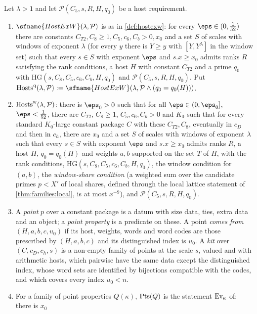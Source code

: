 \begin{definition}\label{pf:stageU:kitsdef}
Let $\lambda>1$ and let $\mathcal P(C_5,s,R,H,q_0)$ be a host requirement.
\begin{enumerate}[label=(\alph*)]
\item $\sfname{HostExW}(\lambda,\mathcal P)$ is as in \cref{def:hostexw}: for every $\eps\in(0,\frac1{52})$ there are constants
$C_{T2},C_8\ge1,C_5,c_6,C_b>0,x_0$ and a set $S$ of scales with windows of exponent $\lambda$ (for every $y$ there is
$Y\ge y$ with $[Y,Y^\lambda]$ in the window set) such that every $s\in S$ with exponent $\eps$ and $s.x\ge x_0$ admits
ranks $R$ satisfying the rank conditions, a host $H$ with constant $C_{T2}$ and a prime $q_0$ with
$\mathrm{HG}(s,C_8,C_5,c_6,C_b,H,q_0)$ and $\mathcal P(C_5,s,R,H,q_0)$. Put
$\stageUHosts^{\mathrm q}(\lambda,\mathcal P):=\sfname{HostExW}(\lambda,\mathcal P\wedge(q_0=q_0(H)))$.
\item $\mathrm{Hosts}^{\mathrm w}(\lambda,\mathcal P)$: there is $\eps_0>0$ such that for all $\eps\in(0,\eps_0]$, $\eps<\frac1{52}$,
there are $C_{T2}$, $C_8\ge1$, $C_5,c_6,C_b>0$ and $K_0$ such that for every standard $K_0$-large constant package $C$ with
these $C_{T2},C_8$, eventually in $c_D$ and then in $c_h$, there are $x_0$ and a set $S$ of scales with windows of exponent
$\lambda$ such that every $s\in S$ with exponent $\eps$ and $s.x\ge x_0$ admits ranks $R$, a host $H$, $q_0=q_0(H)$ and
weights $a,b$ supported on the set $T$ of $H$, with the rank conditions, $\mathrm{HG}(s,C_8,C_5,c_6,C_b,H,q_0)$, the window
condition for $(a,b)$, the \emph{window-share condition} (a weighted sum over the candidate primes $p<X'$ of local shares,
defined through the local lattice statement of \cref{thm:families:local}, is at most $x^{-9}$), and
$\mathcal P(C_5,s,R,H,q_0)$.
\item A \emph{point} $p$ over a constant package is a datum with size data, ties, extra data and an object; a \emph{point
property} is a predicate on these. A point \emph{comes from} $(H,a,b,c,u_0)$ if its host, weights, words and word codes
are those prescribed by $(H,a,b,c)$ and its distinguished index is $u_0$. A \emph{kit} over $(C,c_D,c_h,s)$ is a
non-empty family of points at the scale $s$, valued and with arithmetic hosts, which pairwise have the same data except
the distinguished index, whose word sets are identified by bijections compatible with the codes, and which covers every
index $u_0<n$.
\item For a family of point properties $Q(\kappa)$, $\mathrm{Pts}(Q)$ is the statement $\mathrm{Ev}_\kappa$ of: there is $x_0$

\end{enumerate}
\end{definition}
